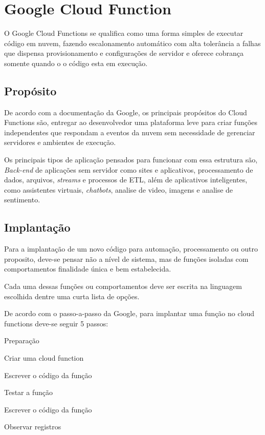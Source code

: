 \section{Google Cloud Function}

O Google Cloud Functions se qualifica como uma forma simples de executar código em nuvem, fazendo escalonamento automático com alta tolerância a falhas que dispensa provisionamento e configurações de servidor e oferece cobrança somente quando o o código esta em execução.

\subsection{Propósito}

De acordo com a documentação da Google, os principais propósitos do Cloud Functions são, entregar ao desenvolvedor uma plataforma leve para criar funções independentes que respondam a eventos da nuvem sem necessidade de gerenciar servidores e ambientes de execução.

Os principais tipos de aplicação pensados para funcionar com essa estrutura são, \textit{Back-end} de aplicações sem servidor como sites e aplicativos, processamento de dados, arquivos, \textit{streams} e processos de ETL, além de aplicativos inteligentes, como assistentes virtuais, \textit{chatbots}, analise de video, imagens e analise de sentimento.

\subsection{Implantação}
Para a implantação de um novo código para automação, processamento ou outro proposito, deve-se pensar não a nível de sistema, mas de funções isoladas com comportamentos finalidade única e bem estabelecida. 

\bigskip
Cada uma dessas funções ou comportamentos deve ser escrita na linguagem escolhida dentre uma curta lista de opções. 

\bigskip
De acordo com o passo-a-passo da Google, para implantar uma função no cloud functions deve-se seguir 5 passos:
\begin{alineas}
	\item Preparação
	\item Criar uma cloud function
	\item Escrever o código da função
	\item Testar a função
	\item Escrever o código da função
	\item Observar registros
\end{alineas}



